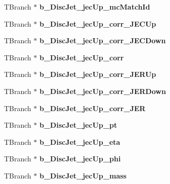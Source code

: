 \begin{DoxyCompactItemize}
T\+Branch $\ast$ {\bfseries b\+\_\+\+Disc\+Jet\+\_\+jec\+Up\+\_\+mc\+Match\+Id}
\item 
\hypertarget{classMiniTree_aa4b868321f1d99b195b30ef1a9d4d2dc}{}\label{classMiniTree_aa4b868321f1d99b195b30ef1a9d4d2dc} 
T\+Branch $\ast$ {\bfseries b\+\_\+\+Disc\+Jet\+\_\+jec\+Up\+\_\+corr\+\_\+\+J\+E\+C\+Up}
\item 
\hypertarget{classMiniTree_a130dc7abd8a4c05fce595bc2563358ca}{}\label{classMiniTree_a130dc7abd8a4c05fce595bc2563358ca} 
T\+Branch $\ast$ {\bfseries b\+\_\+\+Disc\+Jet\+\_\+jec\+Up\+\_\+corr\+\_\+\+J\+E\+C\+Down}
\item 
\hypertarget{classMiniTree_af98447af297e0690755e9ffcc35fbbbf}{}\label{classMiniTree_af98447af297e0690755e9ffcc35fbbbf} 
T\+Branch $\ast$ {\bfseries b\+\_\+\+Disc\+Jet\+\_\+jec\+Up\+\_\+corr}
\item 
\hypertarget{classMiniTree_a2da61ccb2e18f86990404fa883ad02c3}{}\label{classMiniTree_a2da61ccb2e18f86990404fa883ad02c3} 
T\+Branch $\ast$ {\bfseries b\+\_\+\+Disc\+Jet\+\_\+jec\+Up\+\_\+corr\+\_\+\+J\+E\+R\+Up}
\item 
\hypertarget{classMiniTree_a40b8e3d23ccd9bfdbf1e4fee85631a6d}{}\label{classMiniTree_a40b8e3d23ccd9bfdbf1e4fee85631a6d} 
T\+Branch $\ast$ {\bfseries b\+\_\+\+Disc\+Jet\+\_\+jec\+Up\+\_\+corr\+\_\+\+J\+E\+R\+Down}
\item 
\hypertarget{classMiniTree_a59ee6cc5220dc82d681e0eb8feb81218}{}\label{classMiniTree_a59ee6cc5220dc82d681e0eb8feb81218} 
T\+Branch $\ast$ {\bfseries b\+\_\+\+Disc\+Jet\+\_\+jec\+Up\+\_\+corr\+\_\+\+J\+ER}
\item 
\hypertarget{classMiniTree_a4b54fc0861d9021252c9ff1771d79b8d}{}\label{classMiniTree_a4b54fc0861d9021252c9ff1771d79b8d} 
T\+Branch $\ast$ {\bfseries b\+\_\+\+Disc\+Jet\+\_\+jec\+Up\+\_\+pt}
\item 
\hypertarget{classMiniTree_a69661e61c057e1915750f6267fc03c4f}{}\label{classMiniTree_a69661e61c057e1915750f6267fc03c4f} 
T\+Branch $\ast$ {\bfseries b\+\_\+\+Disc\+Jet\+\_\+jec\+Up\+\_\+eta}
\item 
\hypertarget{classMiniTree_a00eaf51ef6f336b92d4823ad5ab35ec9}{}\label{classMiniTree_a00eaf51ef6f336b92d4823ad5ab35ec9} 
T\+Branch $\ast$ {\bfseries b\+\_\+\+Disc\+Jet\+\_\+jec\+Up\+\_\+phi}
\item 
\hypertarget{classMiniTree_ade0d4ce6607335ad17933a56fee1ad82}{}\label{classMiniTree_ade0d4ce6607335ad17933a56fee1ad82} 
T\+Branch $\ast$ {\bfseries b\+\_\+\+Disc\+Jet\+\_\+jec\+Up\+\_\+mass}
\item 
\hypertarget{classMiniTree_a6b19efb8c252ef715265dba7d67aaabc}{}\label{classMiniTree_a6b19efb8c252ef715265dba7d67aaabc} 

\end{DoxyCompactItemize}
